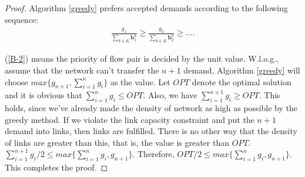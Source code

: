 \documentclass[sigconf]{acmart}
\begin{document}
\begin{appendices}
\begin{proof}
Algorithm \ref{greedy} prefers accepted demands according to the following sequence:
 \begin{eqnarray} \label{B-2}
\frac{g_1}{\sum_{k\in K}\mathbf{b}^k_1} \ge \frac{g_2}{\sum_{k\in K}\mathbf{b}^k_2} \ge ....
\end{eqnarray}

(\ref{B-2})  means the priority of flow pair is decided by the unit value.
W.l.o.g., assume that the network can't transfer the $n+1$ demand,  Algorithm \ref{greedy} will choose $max\{g_{n+1},\sum_{i=1}^{n}g_i\}$ as the value.
Let $OPT$ denote the optimal solution and it is obvious that  $\sum_{i=1}^{n} g_i\le OPT$.
Also, we have  $\sum_{i=1}^{n+1} g_i\ge OPT$.
This holds, since we've already made the density of network as high as possible by the greedy method.
If we violate the link capacity constraint and put the $n+1$ demand into links, then  links are fulfilled.
There is no other way that the density of links are greater than this, that is, the value is greater than $OPT$. 
 $\sum_{i=1}^{n+1} g_i/2 \le max\{\sum_{i=1}^{n} g_i,g_{n+1}\}$.
 Therefore, $OPT/2 \le max\{\sum_{i=1}^{n} g_i,g_{n+1}\}$. This completes the
proof.
\end{proof}

 \end{appendices}
 
\end{document}
